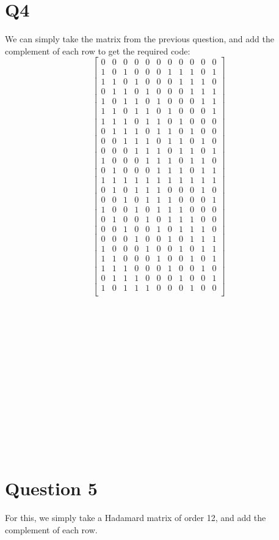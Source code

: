 \documentclass{article}
\begin{document}
\section{Q4}
We can simply take the matrix from the previous question, and add the complement of each row to get the required code:
\[
\begin{bmatrix}
0&0&0&0&0&0&0&0&0&0&0\\
1&0&1&0&0&0&1&1&1&0&1\\
1&1&0&1&0&0&0&1&1&1&0\\
0&1&1&0&1&0&0&0&1&1&1\\
1&0&1&1&0&1&0&0&0&1&1\\
1&1&0&1&1&0&1&0&0&0&1\\
1&1&1&0&1&1&0&1&0&0&0\\
0&1&1&1&0&1&1&0&1&0&0\\
0&0&1&1&1&0&1&1&0&1&0\\
0&0&0&1&1&1&0&1&1&0&1\\
1&0&0&0&1&1&1&0&1&1&0\\
0&1&0&0&0&1&1&1&0&1&1\\
1&1&1&1&1&1&1&1&1&1&1\\
0&1&0&1&1&1&0&0&0&1&0\\
0&0&1&0&1&1&1&0&0&0&1\\
1&0&0&1&0&1&1&1&0&0&0\\
0&1&0&0&1&0&1&1&1&0&0\\
0&0&1&0&0&1&0&1&1&1&0\\
0&0&0&1&0&0&1&0&1&1&1\\
1&0&0&0&1&0&0&1&0&1&1\\
1&1&0&0&0&1&0&0&1&0&1\\
1&1&1&0&0&0&1&0&0&1&0\\
0&1&1&1&0&0&0&1&0&0&1\\
1&0&1&1&1&0&0&0&1&0&0\\
\end{bmatrix}
\]
\\\\\\\\\\\\\\\\\\\\\\\\\
\section{Question 5}
For this, we simply take a Hadamard matrix of order 12, and add the complement of each row.
\end{document}
